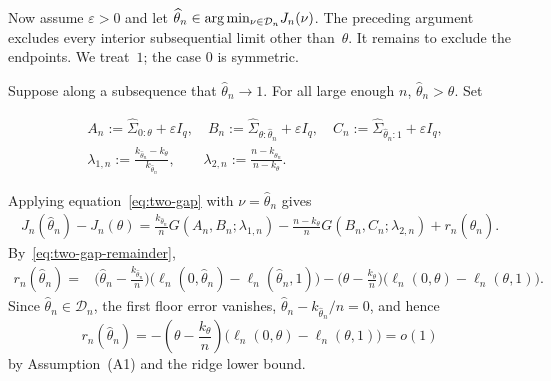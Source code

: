 \documentclass[10pt, letterpaper]{amsart}
\newif\ifwidedisplays
\def\min{{\rm min}}
\begin{document}
Now assume $\varepsilon>0$ and let $\widehat\theta_n\in\arg\min_{\nu\in\mathcal D_n}J_n(\nu)$.
The preceding argument excludes every interior subsequential limit other
than~$\theta$. It remains to exclude the endpoints. We treat~$1$; the case
$0$ is symmetric.

Suppose along a subsequence that $\widehat\theta_n\to1$. For all large enough
$n$, $\widehat\theta_n>\theta$. Set
\ifwidedisplays
\[
A_n:=\widehat\Sigma_{0:\theta}+\varepsilon I_q,\quad
B_n:=\widehat\Sigma_{\theta:\widehat\theta_n}+\varepsilon I_q,\quad
C_n:=\widehat\Sigma_{\widehat\theta_n:1}+\varepsilon I_q,\qquad
\lambda_{1,n}:=\frac{k_{\widehat\theta_n}-k_\theta}{k_{\widehat\theta_n}},\quad
\lambda_{2,n}:=\frac{n-k_{\widehat\theta_n}}{n-k_\theta}.
\]
\else
\begin{align*}
&A_n:=\widehat\Sigma_{0:\theta}+\varepsilon I_q,\quad
B_n:=\widehat\Sigma_{\theta:\widehat\theta_n}+\varepsilon I_q,\quad
C_n:=\widehat\Sigma_{\widehat\theta_n:1}+\varepsilon I_q,\\
&\lambda_{1,n}:=\frac{k_{\widehat\theta_n}-k_\theta}{k_{\widehat\theta_n}},\qquad
\lambda_{2,n}:=\frac{n-k_{\widehat\theta_n}}{n-k_\theta}.
\end{align*}
\fi
 Applying equation~\eqref{eq:two-gap} with $\nu=\widehat\theta_n$ gives
\begin{align}\label{eq:two-gap-endpoint}
J_n(\widehat\theta_n)-J_n(\theta)
=\frac{k_{\widehat\theta_n}}{n}
G(A_n,B_n;\lambda_{1,n})
-\frac{n-k_\theta}{n}G(B_n,C_n;\lambda_{2,n})
+r_n(\widehat\theta_n).
\end{align}
 By~\eqref{eq:two-gap-remainder},
\begin{align*}
r_n(\widehat\theta_n)
={}&\Big(\widehat\theta_n-\frac{k_{\widehat\theta_n}}{n}\Big)
\bigl(\ell_n(0,\widehat\theta_n)-\ell_n(\widehat\theta_n,1)\bigr)
-\Big(\theta-\frac{k_\theta}{n}\Big)
\bigl(\ell_n(0,\theta)-\ell_n(\theta,1)\bigr).
\end{align*}
Since $\widehat\theta_n\in\mathcal D_n$, the first floor error vanishes, $\widehat\theta_n-k_{\widehat\theta_n}/n=0$, and hence
\[
r_n(\widehat\theta_n)
=-\left(\theta-\frac{k_\theta}{n}\right)
\bigl(\ell_n(0,\theta)-\ell_n(\theta,1)\bigr)
=o(1)
\]
by Assumption~(A1) and the ridge lower bound.
\end{document}
